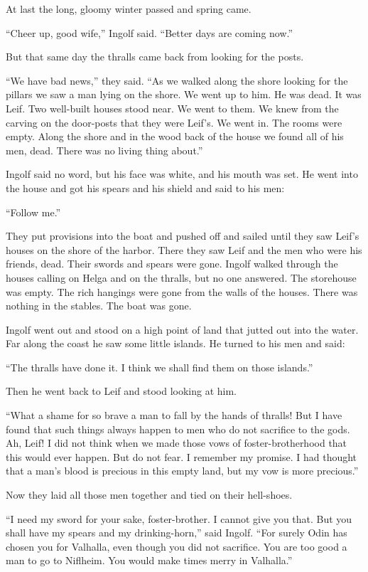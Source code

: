 At last the long, gloomy winter passed and spring came.

``Cheer up, good wife,'' Ingolf said. ``Better days are coming now.''

But that same day the thralls came back from looking for the posts.

``We have bad news,'' they said. ``As we walked along the shore looking
for the pillars we saw a man lying on the shore. We went up to him. He
was dead. It was Leif. Two well-built houses stood near. We went to
them. We knew from the carving on the door-posts that they were Leif's.
We went in. The rooms were empty. Along the shore and in the wood back
of the house we found all of his men, dead. There was no living thing
about.''

Ingolf said no word, but his face was white, and his mouth was set. He
went into the house and got his spears and his shield and said to his
men:

``Follow me.''

They put provisions into the boat and pushed off and sailed until they
saw Leif's houses on the shore of the harbor. There they saw Leif and
the men who were his friends, dead. Their swords and spears were gone.
Ingolf walked through the houses calling on Helga and on the thralls,
but no one answered. The storehouse was empty. The rich hangings were
gone from the walls of the houses. There was nothing in the stables. The
boat was gone.

Ingolf went out and stood on a high point of land that jutted out into
the water. Far along the coast he saw some little islands. He turned to
his men and said:

``The thralls have done it. I think we shall find them on those
islands.''

Then he went back to Leif and stood looking at him.

``What a shame for so brave a man to fall by the hands of thralls! But I
have found that such things always happen to men who do not sacrifice to
the gods. Ah, Leif! I did not think when we made those vows of
foster-brotherhood that this would ever happen. But do not fear. I
remember my promise. I had thought that a man's blood is precious in
this empty land, but my vow is more precious.''

Now they laid all those men together and tied on their hell-shoes.

``I need my sword for your sake, foster-brother. I cannot give you that.
But you shall have my spears and my drinking-horn,'' said Ingolf. ``For
surely Odin has chosen you for Valhalla, even though you did not
sacrifice. You are too good a man to go to Niflheim. You would make
times merry in Valhalla.''

